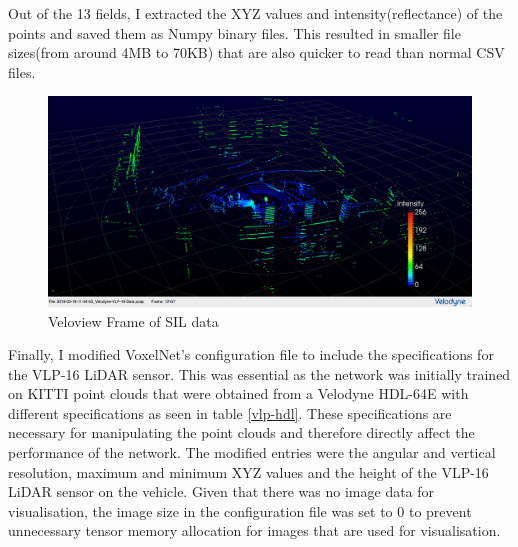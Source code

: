 Out of the 13 fields, I extracted the XYZ values and intensity(reflectance) of the points and saved them as Numpy binary files. This resulted in smaller file sizes(from around 4MB to 70KB) that are also quicker to read than normal CSV files.

\begin{figure}[h]
	\centering
	\includegraphics[width=\linewidth]{images/sil.png}
	\caption{Veloview Frame of SIL data}
	\label{fig:sil}
\end{figure}


Finally, I modified VoxelNet's configuration file to include the specifications for the VLP-16 LiDAR sensor. This was essential as the network was initially trained on KITTI point clouds that were obtained from a Velodyne HDL-64E with different specifications as seen in table \ref{vlp-hdl}. These specifications are necessary for manipulating the point clouds and therefore directly affect the performance of the network. The modified entries were the angular and vertical resolution, maximum and minimum XYZ values and the height of the VLP-16 LiDAR sensor on the vehicle. Given that there was no image data for visualisation, the image size in the configuration file was set to 0 to prevent unnecessary tensor memory allocation for images that are used for visualisation. 

\begin{table}[H]
	\centering
	
	\caption{Velodyne HDL-64E and VLP-16 Specifications.}
	\label{vlp-hdl}
\end{table}



